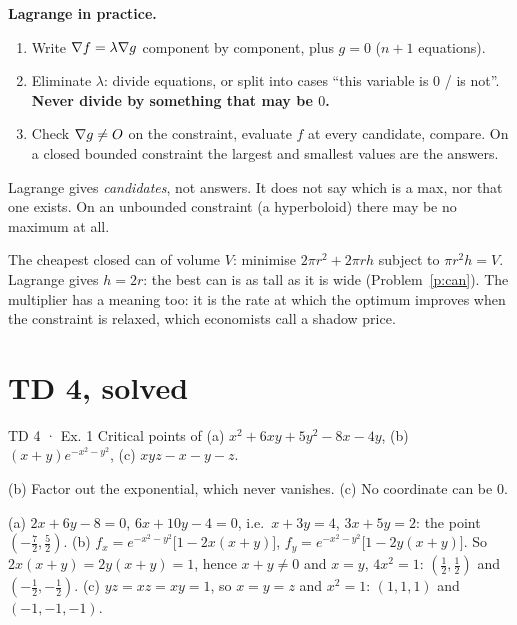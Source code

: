 \begin{method}
\textbf{Lagrange in practice.}
\begin{enumerate}
  \item Write $\nabla f=\lambda\nabla g$ component by component, plus $g=0$ ($n+1$ equations).
  \item Eliminate $\lambda$: divide equations, or split into cases ``this variable is $0$ / is
  not''. \textbf{Never divide by something that may be $0$.}
  \item Check $\nabla g\ne O$ on the constraint, evaluate $f$ at every candidate, compare. On a
  closed bounded constraint the largest and smallest values are the answers.
\end{enumerate}
\end{method}

\begin{trap}
Lagrange gives \emph{candidates}, not answers. It does not say which is a max, nor that one
exists. On an unbounded constraint (a hyperboloid) there may be no maximum at all.
\end{trap}

\begin{reallife}
The cheapest closed can of volume $V$: minimise $2\pi r^2+2\pi rh$ subject to $\pi r^2h=V$.
Lagrange gives $h=2r$: the best can is as tall as it is wide (Problem~\ref{p:can}). The
multiplier has a meaning too: it is the rate at which the optimum improves when the constraint
is relaxed, which economists call a shadow price.
\end{reallife}

\section{TD 4, solved}

\begin{problem}{TD 4 · Ex. 1}
Critical points of (a) $x^2+6xy+5y^2-8x-4y$, (b) $(x+y)e^{-x^2-y^2}$, (c) $xyz-x-y-z$.
\end{problem}
\begin{hint}(b) Factor out the exponential, which never vanishes. (c) No coordinate can be $0$.\end{hint}
\begin{solution}
(a) $2x+6y-8=0$, $6x+10y-4=0$, i.e.\ $x+3y=4$, $3x+5y=2$: the point $(-\tfrac72,\tfrac52)$.
(b) $f_x=e^{-x^2-y^2}\big[1-2x(x+y)\big]$, $f_y=e^{-x^2-y^2}\big[1-2y(x+y)\big]$. So
$2x(x+y)=2y(x+y)=1$, hence $x+y\ne0$ and $x=y$, $4x^2=1$: $(\tfrac12,\tfrac12)$ and $(-\tfrac12,-\tfrac12)$.
(c) $yz=xz=xy=1$, so $x=y=z$ and $x^2=1$: $(1,1,1)$ and $(-1,-1,-1)$.
\end{solution}

